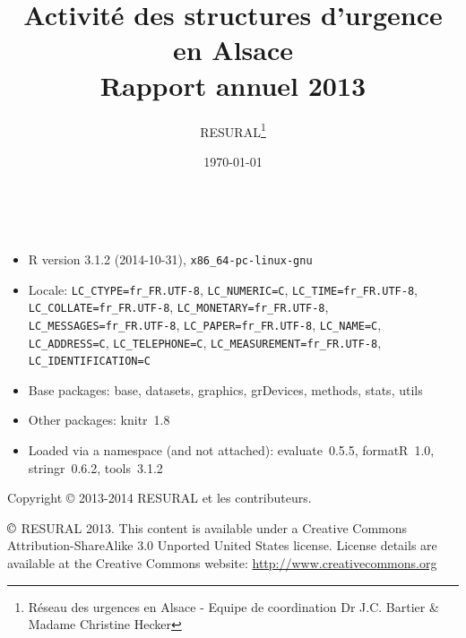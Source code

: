 \documentclass[12pt,english,french,twoside]{book}\usepackage[]{graphicx}\usepackage[]{color}
\begin{document}


\frontmatter

\title{Activité des structures d'urgence en Alsace \\Rapport annuel 2013}
\author{RESURAL\thanks{Réseau des urgences en Alsace - Equipe de coordination Dr J.C.
Bartier \& Madame Christine Hecker}}
\date{\today}
\maketitle


%

\newpage
~\vfill

\begin{itemize}\raggedright
  \item R version 3.1.2 (2014-10-31), \verb|x86_64-pc-linux-gnu|
  \item Locale: \verb|LC_CTYPE=fr_FR.UTF-8|, \verb|LC_NUMERIC=C|, \verb|LC_TIME=fr_FR.UTF-8|, \verb|LC_COLLATE=fr_FR.UTF-8|, \verb|LC_MONETARY=fr_FR.UTF-8|, \verb|LC_MESSAGES=fr_FR.UTF-8|, \verb|LC_PAPER=fr_FR.UTF-8|, \verb|LC_NAME=C|, \verb|LC_ADDRESS=C|, \verb|LC_TELEPHONE=C|, \verb|LC_MEASUREMENT=fr_FR.UTF-8|, \verb|LC_IDENTIFICATION=C|
  \item Base packages: base, datasets, graphics, grDevices,
    methods, stats, utils
  \item Other packages: knitr~1.8
  \item Loaded via a namespace (and not attached): evaluate~0.5.5,
    formatR~1.0, stringr~0.6.2, tools~3.1.2
\end{itemize}


Copyright \copyright{} 2013-2014 RESURAL et les contributeurs.

\noindent $\copyright$ RESURAL 2013. This content is available under a Creative Commons Attribution-ShareAlike 3.0 Unported United States license. License details are available at the Creative Commons website: \url{http://www.creativecommons.org} \\
\end{document}
